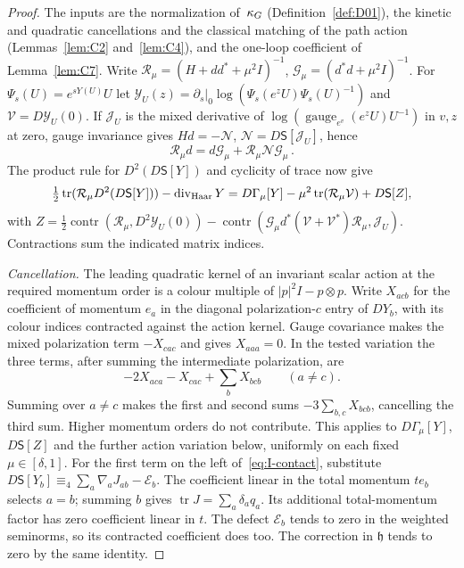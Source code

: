 \begin{proof}
The inputs are the normalization of~$\kappa_G$ (Definition~\ref{def:D01}), the kinetic and quadratic cancellations and the classical matching of the path action (Lemmas~\ref{lem:C2} and~\ref{lem:C4}), and the one-loop coefficient of Lemma~\ref{lem:C7}. Write $\mathcal R_\mu=(H+dd^*+\mu^2I)^{-1}$, $\mathcal G_\mu=(d^*d+\mu^2I)^{-1}$. For $\Psi_s(U)=e^{sY(U)}U$ let $\mathcal Y_U(z)=\partial_s|_0\log(\Psi_s(e^zU)\Psi_s(U)^{-1})$ and $\mathcal V=D\mathcal Y_U(0)$. If $\mathcal J_U$ is the mixed derivative of $\log(\operatorname{gauge}_{e^v}(e^zU)U^{-1})$ in $v,z$ at zero, gauge invariance gives $Hd=-\mathcal N$, $\mathcal N=D\mathsf S[\mathcal J_U]$, hence
\begin{equation*}
\mathcal R_\mu d=d\mathcal G_\mu+\mathcal R_\mu\mathcal N\mathcal G_\mu\,.
\end{equation*}
The product rule for $D^2(D\mathsf S[Y])$ and cyclicity of trace now give
\begin{equation}\label{eq:I-contact}
\tfrac12\operatorname{tr}(\mathcal R_\mu D^2(D\mathsf S[Y]))-\operatorname{div}_{\rm Haar}Y
=D\Gamma_\mu[Y]-\mu^2\operatorname{tr}(\mathcal R_\mu\mathcal V)+D\mathsf S[Z],
\end{equation}
with $Z=\frac12\operatorname{contr}(\mathcal R_\mu,D^2\mathcal Y_U(0))-\operatorname{contr}(\mathcal G_\mu d^*(\mathcal V+\mathcal V^*)\mathcal R_\mu,\mathcal J_U)$. Contractions sum the indicated matrix indices.

\emph{Cancellation.} The leading quadratic kernel of an invariant scalar action at the required momentum order is a colour multiple of $|p|^2I-p\otimes p$. Write $X_{acb}$ for the coefficient of momentum $e_a$ in the diagonal polarization-$c$ entry of $DY_b$, with its colour indices contracted against the action kernel. Gauge covariance makes the mixed polarization term $-X_{cac}$ and gives $X_{aaa}=0$. In the tested variation the three terms, after summing the intermediate polarization, are
\begin{equation*}
-2X_{aca}-X_{cac}+\sum_bX_{bcb}\qquad(a\ne c).
\end{equation*}
Summing over $a\ne c$ makes the first and second sums $-3\sum_{b,c}X_{bcb}$, cancelling the third sum. Higher momentum orders do not contribute. This applies to $D\Gamma_\mu[Y]$, $D\mathsf S[Z]$ and the further action variation below, uniformly on each fixed $\mu\in[\delta,1]$. For the first term on the left of~\eqref{eq:I-contact}, substitute $D\mathsf S[Y_b]\equiv_4\sum_a\nabla_aJ_{ab}-\mathcal E_b$. The coefficient linear in the total momentum $te_b$ selects $a=b$; summing $b$ gives $\operatorname{tr}J=\sum_a\delta_aq_a$. Its additional total-momentum factor has zero coefficient linear in $t$. The defect $\mathcal E_b$ tends to zero in the weighted seminorms, so its contracted coefficient does too. The correction in $\mathfrak h$ tends to zero by the same identity.


\end{proof}
